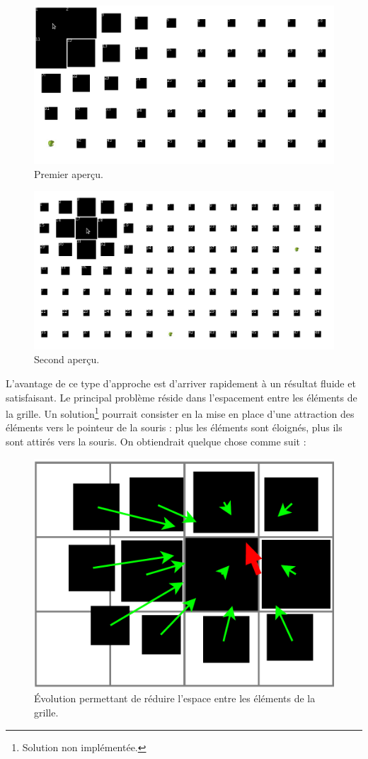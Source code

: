 \begin{figure}[H]
  \centering
  \includegraphics[width=.7\textwidth]{../resources/illustrations/c1}
  \caption{Premier aperçu.}
\end{figure}

\begin{figure}[H]
  \centering
  \includegraphics[width=.7\textwidth]{../resources/illustrations/c2}
  \caption{Second aperçu.}
\end{figure}

L'avantage de ce type d'approche est d'arriver rapidement à un résultat fluide et  satisfaisant. Le principal problème réside dans l'espacement entre les éléments de la grille. Un solution\footnote{Solution non implémentée.} pourrait consister en la mise en place d'une attraction des éléments vers le pointeur de la souris : plus les éléments sont éloignés, plus ils sont attirés vers la souris. On obtiendrait quelque chose comme suit :

\begin{figure}[H]
  \centering
  \includegraphics[width=.7\textwidth]{../resources/illustrations/grob_app_evo}
  \caption{Évolution permettant de réduire l'espace entre les éléments de la grille.}
\end{figure}

